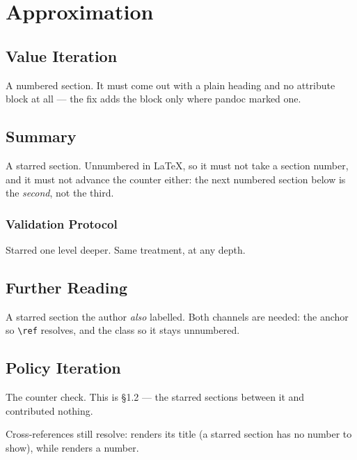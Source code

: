 \chapter{Approximation}
\label{c:approx}

\section{Value Iteration}
\label{sec:vi}

A numbered section. It must come out with a plain heading and no attribute
block at all --- the fix adds the block only where pandoc marked one.

\section*{Summary}

A starred section. Unnumbered in \LaTeX{}, so it must not take a section
number, and it must not advance the counter either: the next numbered
section below is the \emph{second}, not the third.

\subsection*{Validation Protocol}

Starred one level deeper. Same treatment, at any depth.

\section*{Further Reading}
\label{sec:fr}

A starred section the author \emph{also} labelled. Both channels are
needed: the anchor so \verb|\ref| resolves, and the class so it stays
unnumbered.

\section{Policy Iteration}
\label{sec:pi}

The counter check. This is §1.2 --- the starred sections between it and
 contributed nothing.

Cross-references still resolve:  renders its title (a starred
section has no number to show), while  renders a number.
